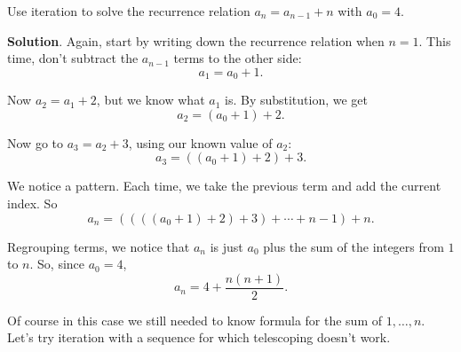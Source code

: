 \documentclass[11pt,]{book}
\theoremstyle{ptxplainnotitle}
\theoremstyle{ptxplaintitle}
\theoremstyle{ptxdefinitionnotitle}
\theoremstyle{ptxdefinitiontitle}
\theoremstyle{ptxdefinitionnotitle}
\theoremstyle{ptxdefinitiontitle}
\theoremstyle{ptxdefinitionnotitle}
\theoremstyle{ptxdefinitiontitle}
\theoremstyle{ptxdefinitiontitlenonumber}
\theoremstyle{ptxdefinitiontitlenonumber}
\numberwithin{equation}{chapter}
\begin{document}
\begin{example}\label{example-21}
\hypertarget{p-440}{}%
Use iteration to solve the recurrence relation \(a_n = a_{n-1} + n\) with \(a_0 = 4\).%
\par\smallskip%
\noindent\textbf{Solution}.\hypertarget{solution-60}{}\quad%
\hypertarget{p-441}{}%
Again, start by writing down the recurrence relation when \(n = 1\). This time, don't subtract the \(a_{n-1}\) terms to the other side:%
\begin{equation*}
a_1 = a_0 + 1.
\end{equation*}
%
\par
\hypertarget{p-442}{}%
Now \(a_2 = a_1 + 2\), but we know what \(a_1\) is. By substitution, we get%
\begin{equation*}
a_2 = (a_0 + 1) + 2.
\end{equation*}
%
\par
\hypertarget{p-443}{}%
Now go to \(a_3 = a_2 + 3\), using our known value of \(a_2\):%
\begin{equation*}
a_3 = ((a_0 + 1) + 2) + 3.
\end{equation*}
%
\par
\hypertarget{p-444}{}%
We notice a pattern. Each time, we take the previous term and add the current index. So%
\begin{equation*}
a_n = ((((a_0 + 1) +2)+3)+\cdots + n-1) + n.
\end{equation*}
%
\par
\hypertarget{p-445}{}%
Regrouping terms, we notice that \(a_n\) is just \(a_0\) plus the sum of the integers from \(1\) to \(n\). So, since \(a_0 = 4\),%
\begin{equation*}
a_n = 4 + \frac{n(n+1)}{2}.
\end{equation*}
%
\end{example}
\hypertarget{p-446}{}%
Of course in this case we still needed to know formula for the sum of \(1,\ldots,n\). Let's try iteration with a sequence for which telescoping doesn't work.%
\end{document}
